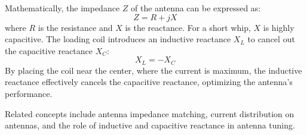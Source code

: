 Mathematically, the impedance \( Z \) of the antenna can be expressed as:
\[
Z = R + jX
\]
where \( R \) is the resistance and \( X \) is the reactance. For a short whip, \( X \) is highly capacitive. The loading coil introduces an inductive reactance \( X_L \) to cancel out the capacitive reactance \( X_C \):
\[
X_L = -X_C
\]
By placing the coil near the center, where the current is maximum, the inductive reactance effectively cancels the capacitive reactance, optimizing the antenna's performance.

Related concepts include antenna impedance matching, current distribution on antennas, and the role of inductive and capacitive reactance in antenna tuning.

